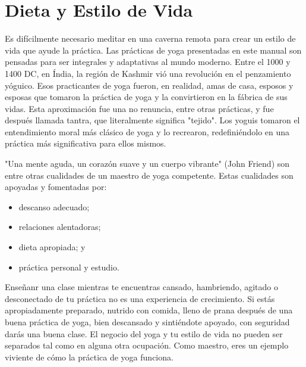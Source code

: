 \section{Dieta y Estilo de Vida}
Es difícilmente necesario meditar en una caverna remota para crear un estilo de vida que ayude la práctica. Las prácticas de yoga presentadas en este manual son pensadas para ser integrales y adaptativas al mundo moderno. Entre el 1000 y 1400 DC, en Índia, la región de Kashmir vió una revolución en el penzamiento yóguico. Esos practicantes de yoga fueron, en realidad, amas de casa, esposos y esposas que tomaron la práctica de yoga y la convirtieron en la fábrica de sus vidas. Esta aproximación fue una no renuncia, entre otras prácticas, y fue despu\'es llamada tantra, que literalmente significa "tejido". Los yoguis tomaron el entendimiento moral más clásico de yoga y lo recrearon, redefini\'endolo en una práctica más significativa para ellos mismos.

"Una mente aguda, un corazón suave y un cuerpo vibrante" (John Friend) son entre otras cualidades de un maestro de yoga competente. Estas cualidades son apoyadas y fomentadas por:
\begin{itemize}
	\item descanso adecuado;
	\item relaciones alentadoras;
	\item dieta apropiada; y
	\item práctica personal y estudio.
\end{itemize}

Enseñanr una clase mientras te encuentras cansado, hambriendo, agitado o desconectado de tu práctica no es una experiencia de crecimiento. Si estás apropiadamente preparado, nutrido con comida, lleno de prana despu\'es de una buena práctica de yoga, bien descansado y sinti\'endote apoyado, con seguridad darás una buena clase. El negocio del yoga y tu estilo de vida no pueden ser separados tal como en alguna otra ocupación. Como maestro, eres un ejemplo viviente de cómo la práctica de yoga funciona.

